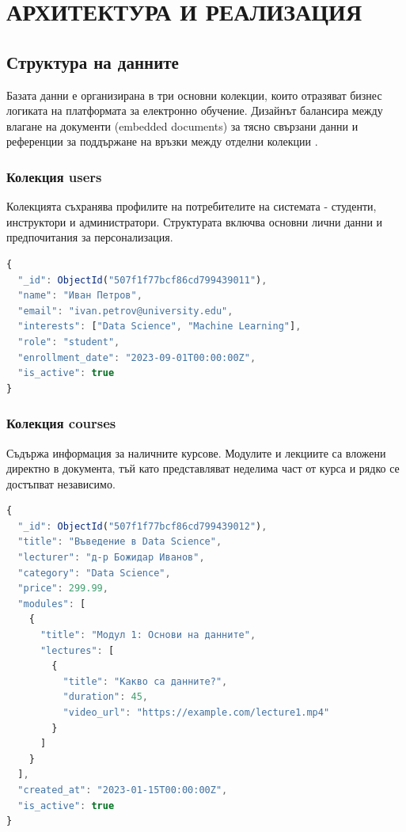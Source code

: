 
\section{АРХИТЕКТУРА И РЕАЛИЗАЦИЯ}

\subsection{Структура на данните}

Базата данни е организирана в три основни колекции, които отразяват бизнес логиката на платформата за електронно обучение. Дизайнът балансира между влагане на документи (embedded documents) за тясно свързани данни и референции за поддържане на връзки между отделни колекции \cite{banker2011mongodb}.

\subsubsection{Колекция users}

Колекцията съхранява профилите на потребителите на системата - студенти, инструктори и администратори. Структурата включва основни лични данни и предпочитания за персонализация.

\begin{lstlisting}[language=JavaScript,caption=Примерен документ от колекцията users]
{
  "_id": ObjectId("507f1f77bcf86cd799439011"),
  "name": "Иван Петров",
  "email": "ivan.petrov@university.edu",
  "interests": ["Data Science", "Machine Learning"],
  "role": "student",
  "enrollment_date": "2023-09-01T00:00:00Z",
  "is_active": true
}
\end{lstlisting}

\subsubsection{Колекция courses}

Съдържа информация за наличните курсове. Модулите и лекциите са вложени директно в документа, тъй като представляват неделима част от курса и рядко се достъпват независимо.

\begin{lstlisting}[language=JavaScript]
{
  "_id": ObjectId("507f1f77bcf86cd799439012"),
  "title": "Въведение в Data Science",
  "lecturer": "д-р Божидар Иванов",
  "category": "Data Science",
  "price": 299.99,
  "modules": [
    {
      "title": "Модул 1: Основи на данните",
      "lectures": [
        {
          "title": "Какво са данните?",
          "duration": 45,
          "video_url": "https://example.com/lecture1.mp4"
        }
      ]
    }
  ],
  "created_at": "2023-01-15T00:00:00Z",
  "is_active": true
}
\end{lstlisting}

